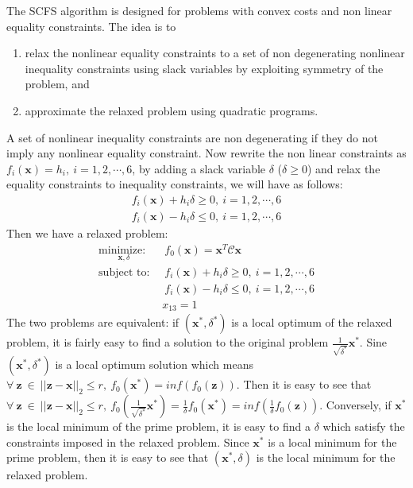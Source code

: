 \documentclass[a4paper]{report}
\begin{document}
The SCFS algorithm is designed for problems with convex costs and non linear equality constraints. The idea is to \begin{enumerate} \item relax the nonlinear equality constraints to a set of non degenerating nonlinear inequality constraints using slack variables by exploiting symmetry of the problem, and \item
approximate the relaxed problem using quadratic programs. \end{enumerate}   
A set of nonlinear inequality constraints are non degenerating
if they do not imply any nonlinear equality constraint.
Now rewrite the non linear constraints as $f_i(\mathbf{x})=h_i,\ i=1,2,\cdots,6$, by adding a slack variable $\delta$ ($\delta \geq 0$) and relax the equality constraints to inequality constraints, we will have as follows:
\begin{align}
f_i(\mathbf{x}) + h_i\delta \geq 0,\ i=1,2,\cdots,6 \nonumber \\
f_i(\mathbf{x}) - h_i\delta \leq 0,\ i=1,2,\cdots,6  
\label{eq:relax_cons}
\end{align}
Then we have a relaxed problem:
\begin{align}
\underset{\mathbf{x}, \delta}{\text{minimize: }}& \ f_0(\mathbf{x})=\mathbf{x}^T\mathcal{C}\mathbf{x}\\
\label{eq:non_con1}
\text{subject to: }& \ f_i(\mathbf{x}) + h_i\delta \geq 0,\ i=1,2,\cdots,6  \\
\label{eq:non_con2}
& \ f_i(\mathbf{x}) - h_i\delta \leq 0,\ i=1,2,\cdots,6 \nonumber \\ \nonumber 
& x_{13} = 1
\end{align}
The two problems are equivalent: if $(\mathbf{x}^{*}, \delta^{*})$ is a local optimum of the relaxed problem, it is fairly easy to find a solution to the original problem $\frac{1}{\sqrt{\delta^*}}\mathbf{x}^*$. Sine $(\mathbf{x}^*, \delta^*)$ is a local optimum solution which means $\forall\ \mathbf{z}\ \in\ ||\mathbf{z}-\mathbf{x}||_2 \leq r,\ f_0(\mathbf{x}^{*})=inf\left(f_0(\mathbf{z})\right)$. 
Then it is easy to see that $\forall\ \mathbf{z}\ \in\ ||\mathbf{z}-\mathbf{x}||_2 \leq r,\ f_0(\frac{1}{\sqrt{\delta^*}}\mathbf{x}^*)=\frac{1}{\delta}f_0(\mathbf{x}^*)=inf\left(\frac{1}{\delta}f_0(\mathbf{z})\right)$. Conversely, if $\mathbf{x}^*$ is the local minimum of the prime problem, it is easy to find a $\delta$ which satisfy the constraints imposed in the relaxed problem. Since $\mathbf{x}^*$ is a local minimum for the prime problem, then it is easy to see that $(\mathbf{x}^*, \delta)$ is the local minimum for the relaxed problem. \\
\end{document}
